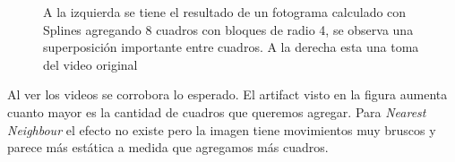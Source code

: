 \begin{figure}[H]
\centering
\begin{minipage}{0.48\textwidth}
\end{minipage}%
\hfill
\begin{minipage}{0.48\textwidth}   

\end{minipage}
\caption{\footnotesize A la izquierda se tiene el resultado de un fotograma calculado con Splines agregando 8 cuadros con bloques de radio 4, se observa una superposición importante entre cuadros. A la derecha esta una toma del video original}
\end{figure}


Al ver los videos se corrobora lo esperado. El artifact visto en la figura aumenta cuanto mayor es la cantidad de cuadros que queremos agregar. Para \textit{Nearest Neighbour} el efecto no existe pero la imagen tiene movimientos muy bruscos y parece más estática a medida que agregamos más cuadros.

